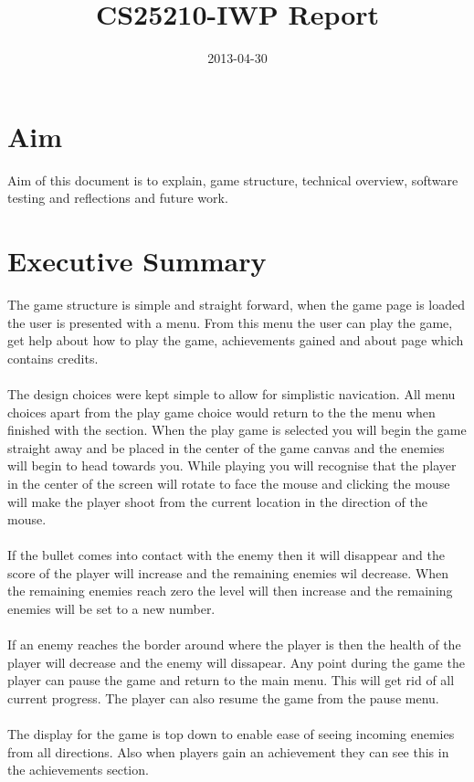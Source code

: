 \documentclass{article}
\title{CS25210-IWP Report}
\date{2013-04-30}
\begin{document}
\maketitle
\newpage
\tableofcontents
\newpage

\section{Aim}
Aim of this document is to explain, game structure, technical overview, software testing and reflections and future work.

\section{Executive Summary}
The game structure is simple and straight forward, when the game page is loaded the user is presented with a menu. From this menu the user can play the game, get help about how to play the game, achievements gained and about page which contains credits.
\\\\
The design choices were kept simple to allow for simplistic navication. All menu choices apart from the play game choice would return to the the menu when finished with the section. When the play game is selected you will begin the game straight away and be placed in the center of the game canvas and the enemies will begin to head towards you. While playing you will recognise that the player in the center of the screen will rotate to face the mouse and clicking the mouse will make the player shoot from the current location in the direction of the mouse.
\\\\
If the bullet comes into contact with the enemy then it will disappear and the score of the player will increase and the remaining enemies wil decrease. When the remaining enemies reach zero the level will then increase and the remaining enemies will be set to a new number.
\\\\
If an enemy reaches the border around where the player is then the health of the player will decrease and the enemy will dissapear. Any point during the game the player can pause the game and return to the main menu. This will get rid of all current progress. The player can also resume the game from the pause menu.
\\\\
The display for the game is top down to enable ease of seeing incoming enemies from all directions. Also when players gain an achievement they can see this in the achievements section.
\end{document}
